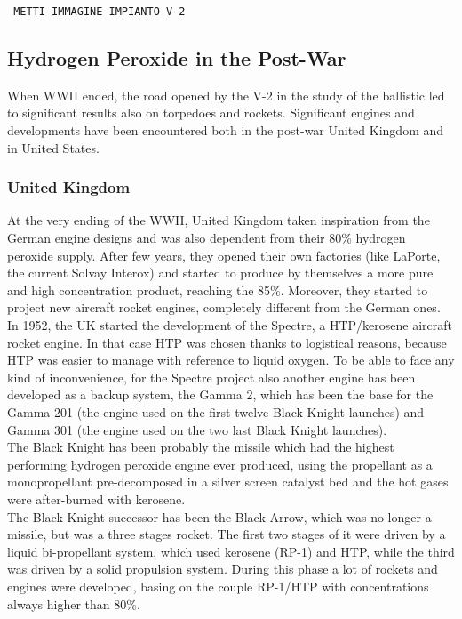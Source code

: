 \documentclass[a4paper]{report}
\begin{document}
\texttt{\color{red} METTI IMMAGINE IMPIANTO V-2}

\subsection{Hydrogen Peroxide in the Post-War}

When WWII ended, the road opened by the V-2 in the study of the ballistic led to significant results also on torpedoes and rockets. Significant engines and developments have been encountered both in the post-war United Kingdom and in United States. \\

\subsubsection{United Kingdom}

At the very ending of the WWII, United Kingdom taken inspiration from the German engine designs and was also dependent from their 80\% hydrogen peroxide supply. After few years, they opened their own factories (like LaPorte, the current Solvay Interox) and started to produce by themselves a more pure and high concentration product, reaching the 85\%. Moreover, they started to project new aircraft rocket engines, completely different from the German ones. In 1952, the UK started the development of the Spectre, a HTP/kerosene aircraft rocket engine. In that case HTP was chosen thanks to logistical reasons, because HTP was easier to manage with reference to liquid oxygen. To be able to face any kind of inconvenience, for the Spectre project also another engine has been developed as a backup system, the Gamma 2, which has been the base for the Gamma 201 (the engine used on the first twelve Black Knight launches) and Gamma 301 (the engine used on the two last Black Knight launches). \\ 
The Black Knight has been probably the missile which had the highest performing hydrogen peroxide engine ever produced, using the propellant as a monopropellant pre-decomposed in a silver screen catalyst bed and the hot gases were after-burned with kerosene. \\
The Black Knight successor has been the Black Arrow, which was no longer a missile, but was a three stages rocket. The first two stages of it were driven by a liquid bi-propellant system, which used kerosene (RP-1) and HTP, while the third was driven by a solid propulsion system. During this phase a lot of rockets and engines were developed, basing on the couple RP-1/HTP with concentrations always higher than 80\%.\\
\end{document}
